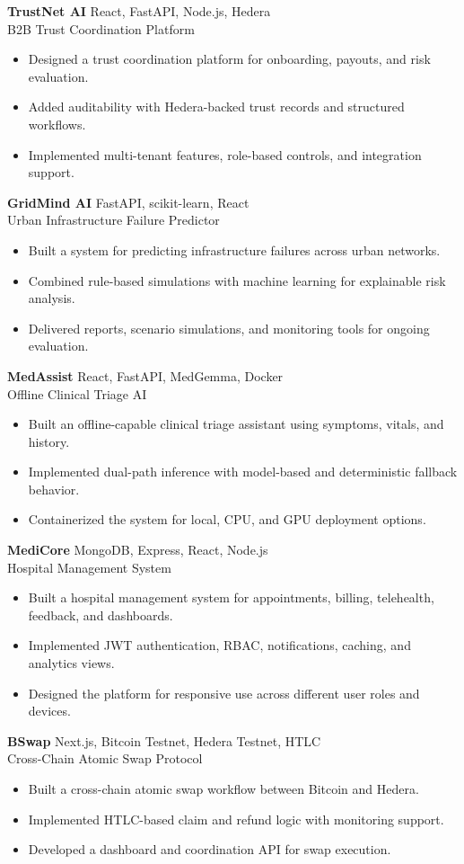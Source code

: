 \documentclass[10pt,a4paper]{article}
\newcommand{\entrymeta}[1]{{\small\color{muted}#1}}
\newcommand{\cvproject}[4]{
  \vspace{0.4em}
  {\bfseries\color{ink}#1} \hfill {\entrymeta{#2}} \\
  {\small\color{accent}#3}
  \begin{itemize}
    #4
  \end{itemize}
}
\begin{document}
\cvproject
  {TrustNet AI}
  {React, FastAPI, Node.js, Hedera}
  {B2B Trust Coordination Platform}
  {
    \item Designed a trust coordination platform for onboarding, payouts, and risk evaluation.
    \item Added auditability with Hedera-backed trust records and structured workflows.
    \item Implemented multi-tenant features, role-based controls, and integration support.
  }

\cvproject
  {GridMind AI}
  {FastAPI, scikit-learn, React}
  {Urban Infrastructure Failure Predictor}
  {
    \item Built a system for predicting infrastructure failures across urban networks.
    \item Combined rule-based simulations with machine learning for explainable risk analysis.
    \item Delivered reports, scenario simulations, and monitoring tools for ongoing evaluation.
  }

\cvproject
  {MedAssist}
  {React, FastAPI, MedGemma, Docker}
  {Offline Clinical Triage AI}
  {
    \item Built an offline-capable clinical triage assistant using symptoms, vitals, and history.
    \item Implemented dual-path inference with model-based and deterministic fallback behavior.
    \item Containerized the system for local, CPU, and GPU deployment options.
  }

\cvproject
  {MediCore}
  {MongoDB, Express, React, Node.js}
  {Hospital Management System}
  {
    \item Built a hospital management system for appointments, billing, telehealth, feedback, and dashboards.
    \item Implemented JWT authentication, RBAC, notifications, caching, and analytics views.
    \item Designed the platform for responsive use across different user roles and devices.
  }

\cvproject
  {BSwap}
  {Next.js, Bitcoin Testnet, Hedera Testnet, HTLC}
  {Cross-Chain Atomic Swap Protocol}
  {
    \item Built a cross-chain atomic swap workflow between Bitcoin and Hedera.
    \item Implemented HTLC-based claim and refund logic with monitoring support.
    \item Developed a dashboard and coordination API for swap execution.
  }
\end{document}
